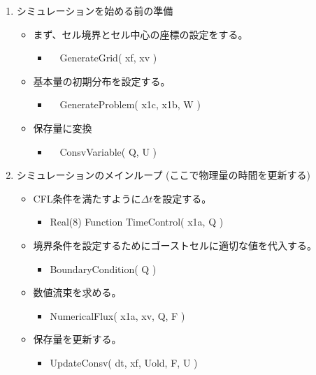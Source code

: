 \begin{enumerate} 
     \item シミュレーションを始める前の準備
     \begin{itemize}
        \item まず、セル境界とセル中心の座標の設定をする。
        \begin{itemize}
            \item {\ttfamily　GenerateGrid( {{\color{red}xf, xv} })} 
        \end{itemize}
        \item 基本量の初期分布を設定する。
        \begin{itemize}
            \item {\ttfamily　GenerateProblem( {\color{blue} x1c, x1b}, {\color{red} W} )}
        \end{itemize}
        \item 保存量に変換
        \begin{itemize}
            \item {\ttfamily　ConsvVariable( {\color{blue} Q}, {\color{red} U} )}
        \end{itemize}
     \end{itemize}

     \item シミュレーションのメインループ (ここで物理量の時間を更新する)
     \begin{itemize}
         \item CFL条件を満たすように$\Delta t$を設定する。 
         \begin{itemize}
             \item  {\ttfamily Real(8) Function 
             TimeControl( {\color{blue}x1a, Q} )}
         \end{itemize}
         \item 境界条件を設定するためにゴーストセルに適切な値を代入する。
         \begin{itemize}
             \item  {\ttfamily BoundaryCondition( {\color{red} Q} )}
           \end{itemize}
           \item 数値流束を求める。 
           \begin{itemize}
               \item  {\ttfamily NumericalFlux( {\color{blue} x1a, xv, Q}, {\color{red} F} )}
           \end{itemize}
          \item 保存量を更新する。 
          \begin{itemize}
              \item  {\ttfamily UpdateConsv( {\color{blue} dt, xf, Uold, F}, {\color{red} U} )}
          \end{itemize}
            

\end{itemize}
\end{enumerate}
